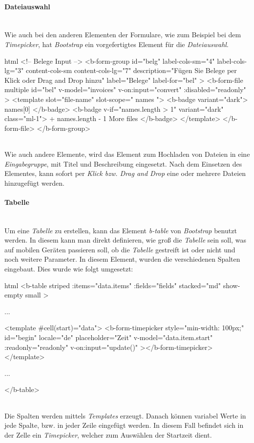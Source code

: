 \paragraph{Dateiauswahl}
~\\
Wie auch bei den anderen Elementen der Formulare, wie zum Beispiel bei dem \textit{Timepicker}, hat \textit{Bootstrap} ein vorgefertigtes Element für die \textit{Dateiauswahl}. 
\begin{code}{html}
	<!-- Belege Input -->
	<b-form-group
	  id="belg"
	  label-cols-sm="4"
	  label-cols-lg="3"
	  content-cols-sm
	  content-cols-lg="7"
	  description="Fügen Sie Belege per Klick oder Drag and Drop hinzu"
	  label="Belege"
	  label-for="bel"
	>
	  <b-form-file
		multiple
		id="bel"
		v-model="invoices"
		v-on:input="convert"
		:disabled="readonly"
	  >
		<template slot="file-name" slot-scope="{ names }">
		  <b-badge variant="dark">{{ names[0] }}</b-badge>
		  <b-badge v-if="names.length > 1" variant="dark" class="ml-1">
			+ {{ names.length - 1 }} More files
		  </b-badge>
		</template>
	  </b-form-file>
	</b-form-group>
\end{code}
	\label{list:dateiselect} ~\\
Wie auch andere Elemente, wird das Element zum Hochladen von Dateien in eine \textit{Eingabegruppe}, mit Titel und Beschreibung eingesetzt. Nach dem Einsetzen des Elementes, kann sofort per \textit{Klick bzw. Drag and Drop} eine oder mehrere Dateien hinzugefügt werden.
\paragraph{Tabelle}
~\\
Um eine \textit{Tabelle} zu erstellen, kann das Element \textit{b-table} von \textit{Bootstrap} benutzt werden. In diesem kann man direkt definieren, wie groß die \textit{Tabelle} sein soll, was auf mobilen Geräten passieren soll, ob die \textit{Tabelle} gestreift ist oder nicht und noch weitere Parameter. In diesem Element, wurden die verschiedenen Spalten eingebaut. Dies wurde wie folgt umgesetzt:
\begin{code}{html}
	<b-table
          striped
          :items="data.items"
          :fields="fields"
          stacked="md"
          show-empty
          small
    >

		...

		<template #cell(start)="data">
			<b-form-timepicker
				style="min-width: 100px;"
				id="begin"
				locale="de"
				placeholder="Zeit"
				v-model="data.item.start"
				:readonly="readonly"
				v-on:input="update()"
			></b-form-timepicker>
		</template>

		...

	</b-table>
\end{code}
	\label{list:bsptable} ~\\
Die Spalten werden mittels \textit{Templates} erzeugt. Danach können variabel Werte in jede Spalte, bzw. in jeder Zeile eingefügt werden. In diesem Fall befindet sich in der Zelle ein \textit{Timepicker}, welcher zum Auswählen der Startzeit dient.
\newpage
